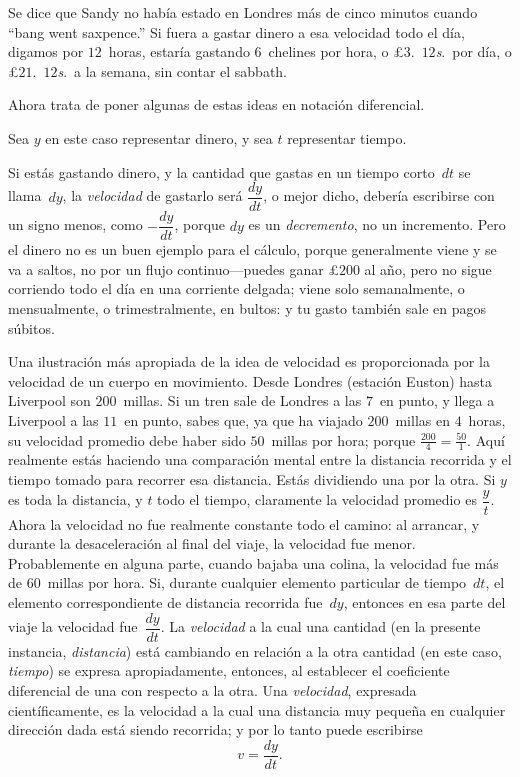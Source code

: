 \documentclass[12pt]{book}[2005/09/16]
\newcommand{\DPPageSep}[2]{\Pagelabel{#2}}
\newcommand{\Pagelabel}[1]
  {\phantomsection\label{#1}}
\begin{document}
Se dice que Sandy no había estado en Londres
\DPPageSep{066.png}{54}%
más de cinco minutos cuando ``bang went saxpence.'' Si
fuera a gastar dinero a esa velocidad todo el día,
digamos por $12$~horas, estaría gastando $6$~chelines
por hora, o £$3$.~$12$\textit{s}.\ por día, o £$21$.~$12$\textit{s}.\ a la semana,
sin contar el sabbath.

Ahora trata de poner algunas de estas ideas en notación diferencial.

Sea $y$ en este caso representar dinero, y sea $t$ representar
tiempo.

Si estás gastando dinero, y la cantidad que
gastas en un tiempo corto~$dt$ se llama~$dy$, la \emph{velocidad} de
gastarlo será $\dfrac{dy}{dt}$, o mejor dicho, debería escribirse
con un signo menos, como $-\dfrac{dy}{dt}$, porque $dy$ es un \emph{decremento},
no un incremento. Pero el dinero no es un buen ejemplo
para el cálculo, porque generalmente viene y se va
a saltos, no por un flujo continuo---puedes ganar
£$200$ al año, pero no sigue corriendo todo
el día en una corriente delgada; viene solo semanalmente,
o mensualmente, o trimestralmente, en bultos: y tu gasto
también sale en pagos súbitos.

Una ilustración más apropiada de la idea de velocidad es
proporcionada por la velocidad de un cuerpo en movimiento. Desde
Londres (estación Euston) hasta Liverpool son $200$~millas.
Si un tren sale de Londres a las $7$~en punto, y llega a
Liverpool a las $11$~en punto, sabes que, ya que ha
viajado $200$~millas en $4$~horas, su velocidad promedio debe
haber sido $50$~millas por hora; porque $\frac{200}{4} = \frac{50}{1}$. Aquí
realmente estás haciendo una comparación mental entre
\DPPageSep{067.png}{55}%
la distancia recorrida y el tiempo tomado para recorrer
esa distancia. Estás dividiendo una por la otra. Si $y$ es
toda la distancia, y $t$ todo el tiempo, claramente la
velocidad promedio es $\dfrac{y}{t}$. Ahora la velocidad no fue realmente
constante todo el camino: al arrancar, y durante la
desaceleración al final del viaje, la velocidad fue
menor. Probablemente en alguna parte, cuando bajaba una colina,
la velocidad fue más de $60$~millas por hora. Si, durante
cualquier elemento particular de tiempo~$dt$, el elemento correspondiente
de distancia recorrida fue~$dy$, entonces en esa
parte del viaje la velocidad fue~$\dfrac{dy}{dt}$. La \emph{velocidad} a
la cual una cantidad (en la presente instancia, \emph{distancia})
está cambiando en relación a la otra cantidad (en este
caso, \emph{tiempo}) se expresa apropiadamente, entonces, al establecer el
coeficiente diferencial de una con respecto a la otra.
Una \emph{velocidad}, expresada científicamente, es la velocidad a la cual
una distancia muy pequeña en cualquier dirección dada está siendo
recorrida; y por lo tanto puede escribirse
\[
v = \dfrac{dy}{dt}.
\]
\end{document}
